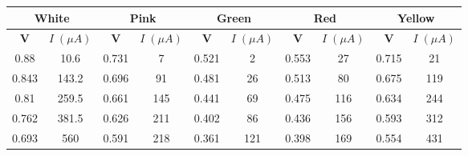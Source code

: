 \begin{table}[H]
	\centering
	\begin{tabular}{|cc|cc|cc|cc|cc|}
		\hline
		\multicolumn{2}{|c|}{\textbf{White}} & \multicolumn{2}{c|}{\textbf{Pink}} & \multicolumn{2}{c|}{\textbf{Green}} & \multicolumn{2}{c|}{\textbf{Red}} & \multicolumn{2}{c|}{\textbf{Yellow}}                                                                                                                                             \\ \hline
		\multicolumn{1}{|c|}{\textbf{V}}     & \textbf{$I\;(\mu A)$}              & \multicolumn{1}{c|}{\textbf{V}}     & \textbf{$I\;(\mu A)$}             & \multicolumn{1}{c|}{\textbf{V}}      & \textbf{$I\;(\mu A)$} & \multicolumn{1}{c|}{\textbf{V}} & \textbf{$I\;(\mu A)$} & \multicolumn{1}{c|}{\textbf{V}} & \textbf{$I\;(\mu A)$} \\ \hline
		\multicolumn{1}{|c|}{0.88}           & 10.6                               & \multicolumn{1}{c|}{0.731}          & 7                                 & \multicolumn{1}{c|}{0.521}           & 2                     & \multicolumn{1}{c|}{0.553}      & 27                    & \multicolumn{1}{c|}{0.715}      & 21                    \\ \hline
		\multicolumn{1}{|c|}{0.843}          & 143.2                              & \multicolumn{1}{c|}{0.696}          & 91                                & \multicolumn{1}{c|}{0.481}           & 26                    & \multicolumn{1}{c|}{0.513}      & 80                    & \multicolumn{1}{c|}{0.675}      & 119                   \\ \hline
		\multicolumn{1}{|c|}{0.81}           & 259.5                              & \multicolumn{1}{c|}{0.661}          & 145                               & \multicolumn{1}{c|}{0.441}           & 69                    & \multicolumn{1}{c|}{0.475}      & 116                   & \multicolumn{1}{c|}{0.634}      & 244                   \\ \hline
		\multicolumn{1}{|c|}{0.762}          & 381.5                              & \multicolumn{1}{c|}{0.626}          & 211                               & \multicolumn{1}{c|}{0.402}           & 86                    & \multicolumn{1}{c|}{0.436}      & 156                   & \multicolumn{1}{c|}{0.593}      & 312                   \\ \hline
		\multicolumn{1}{|c|}{0.693}          & 560                                & \multicolumn{1}{c|}{0.591}          & 218                               & \multicolumn{1}{c|}{0.361}           & 121                   & \multicolumn{1}{c|}{0.398}      & 169                   & \multicolumn{1}{c|}{0.554}      & 431                   \\ \hline

\end{tabular}
\end{table}

